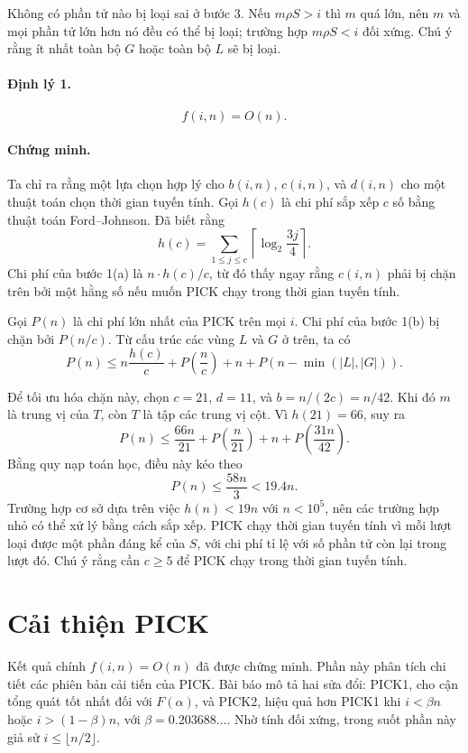 \documentclass[11pt]{article}
\newcommand{\PICK}{\textsc{PICK}}
\newcommand{\PICKone}{\textsc{PICK1}}
\newcommand{\PICKtwo}{\textsc{PICK2}}
\begin{document}
Không có phần tử nào bị loại sai ở bước 3. Nếu \(m\rho S>i\) thì \(m\) quá
lớn, nên \(m\) và mọi phần tử lớn hơn nó đều có thể bị loại; trường hợp
\(m\rho S<i\) đối xứng. Chú ý rằng ít nhất toàn bộ \(G\) hoặc toàn bộ \(L\) sẽ
bị loại.

\paragraph{Định lý 1.}
\[
  f(i,n)=O(n).
\]

\paragraph{Chứng minh.}
Ta chỉ ra rằng một lựa chọn hợp lý cho \(b(i,n)\), \(c(i,n)\), và \(d(i,n)\)
cho một thuật toán chọn thời gian tuyến tính. Gọi \(h(c)\) là chi phí sắp xếp
\(c\) số bằng thuật toán Ford--Johnson. Đã biết rằng
\[
  h(c)=\sum_{1\le j\le c}\left\lceil\log_2\frac{3j}{4}\right\rceil.
  \tag{4}
\]
Chi phí của bước 1(a) là \(n\cdot h(c)/c\), từ đó thấy ngay rằng \(c(i,n)\)
phải bị chặn trên bởi một hằng số nếu muốn \PICK{} chạy trong thời gian tuyến
tính.

Gọi \(P(n)\) là chi phí lớn nhất của \PICK{} trên mọi \(i\). Chi phí của bước
1(b) bị chặn bởi \(P(n/c)\). Từ cấu trúc các vùng \(L\) và \(G\) ở trên, ta có
\[
  P(n)\le
  n\frac{h(c)}{c}
  +P\!\left(\frac{n}{c}\right)
  +n
  +P(n-\min(|L|,|G|)).
  \tag{5}
\]

Để tối ưu hóa chặn này, chọn \(c=21\), \(d=11\), và \(b=n/(2c)=n/42\). Khi đó
\(m\) là trung vị của \(T\), còn \(T\) là tập các trung vị cột. Vì
\(h(21)=66\), suy ra
\[
  P(n)\le \frac{66n}{21}
  +P\!\left(\frac{n}{21}\right)
  +n
  +P\!\left(\frac{31n}{42}\right).
  \tag{6}
\]
Bằng quy nạp toán học, điều này kéo theo
\[
  P(n)\le \frac{58n}{3}<19.4n.
  \tag{7}
\]
Trường hợp cơ sở dựa trên việc \(h(n)<19n\) với \(n<10^5\), nên các trường
hợp nhỏ có thể xử lý bằng cách sắp xếp. \PICK{} chạy thời gian tuyến tính vì
mỗi lượt loại được một phần đáng kể của \(S\), với chi phí tỉ lệ với số phần
tử còn lại trong lượt đó. Chú ý rằng cần \(c\ge 5\) để \PICK{} chạy trong
thời gian tuyến tính.

\section{Cải thiện \PICK}

Kết quả chính \(f(i,n)=O(n)\) đã được chứng minh. Phần này phân tích chi tiết
các phiên bản cải tiến của \PICK. Bài báo mô tả hai sửa đổi: \PICKone, cho cận
tổng quát tốt nhất đối với \(F(\alpha)\), và \PICKtwo, hiệu quả hơn \PICKone{}
khi \(i<\beta n\) hoặc \(i>(1-\beta)n\), với \(\beta=0.203688\ldots\). Nhờ
tính đối xứng, trong suốt phần này giả sử \(i\le \lfloor n/2\rfloor\).
\end{document}
